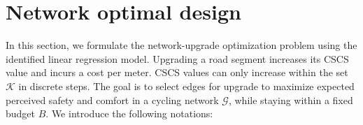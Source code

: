 \documentclass[lettersize,journal]{IEEEtran}
\begin{document}
\section{Network optimal design}
\label{optimization_problem}


In this section, we formulate the network-upgrade optimization problem using the identified linear regression model. Upgrading a road segment increases its CSCS value and incurs a cost per meter. CSCS values can only increase within the set $\mathcal{K}$ in discrete steps. The goal is to select edges for upgrade to maximize expected perceived safety and comfort in a cycling network $\mathcal{G}$, while staying within a fixed budget $B$. We introduce the following notations:
\end{document}
